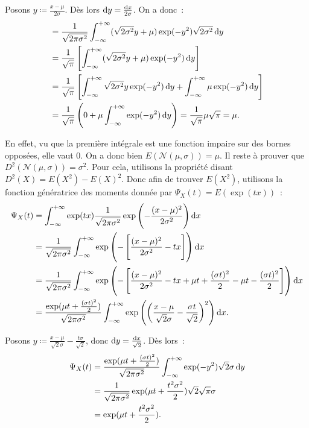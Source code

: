 \documentclass{article}
\newcommand{\Nms}{{\mathcal N(\mu, \sigma)}}
\begin{document}
			Posons $y \coloneqq\frac {x-\mu}{2\sigma}$. Dès lors $\dif y = \frac {\dif x}{2\sigma}$. On a donc~:
			\begin{align*}
				&= \frac 1{\sqrt {2\pi\sigma^2}}\int_{-\infty}^{+\infty}(\sqrt {2\sigma^2}y + \mu)\exp(-y^2)\sqrt {2\sigma^2}\dif y \\
				&= \frac 1{\sqrt \pi}\left[\int_{-\infty}^{+\infty}(\sqrt {2\sigma^2}y + \mu)\exp(-y^2)\dif y\right] \\
				&= \frac 1{\sqrt \pi}\left[\int_{-\infty}^{+\infty}\sqrt {2\sigma^2}y\exp(-y^2)\dif y + \int_{-\infty}^{+\infty}\mu\exp(-y^2)\dif y\right] \\
				&= \frac 1{\sqrt{\pi}}\left(0 + \mu\int_{-\infty}^{+\infty}\exp(-y^2)\dif y\right) = \frac 1{\sqrt \pi}\mu\sqrt {\pi} = \mu.
			\end{align*}

			En effet, vu que la première intégrale est une fonction impaire sur des bornes opposées, elle vaut 0. On a donc bien $E(\Nms) = \mu$. Il reste à prouver que
			$D^2(\Nms) = \sigma^2$. Pour cela, utilisons la propriété disant $D^2(X) = E(X^2) - E(X)^2$. Donc afin de trouver $E(X^2)$, utilisons la fonction génératrice
			des moments donnée par $\Psi_X(t) = E(\exp(tx))$~:
			\begin{align*}
				\Psi_X(t) &= \int_{-\infty}^{+\infty}\exp(tx)\frac 1{\sqrt {2\pi\sigma^2}}\exp\left(-\frac {(x-\mu)^2}{2\sigma^2}\right)\dif x \\
					&= \frac 1{\sqrt {2\pi\sigma^2}}\int_{-\infty}^{+\infty}\exp\left(-\left[\frac {(x-\mu)^2}{2\sigma^2} - tx\right]\right)\dif x \\
					&= \frac 1{\sqrt {2\pi\sigma^2}}\int_{-\infty}^{+\infty}\exp\left(-\left[\frac {(x-\mu)^2}{2\sigma^2} - tx
						+ \mu t + \frac {(\sigma t)^2}2 - \mu t - \frac {(\sigma t)^2}2\right]\right)\dif x \\
					&= \frac {\exp(\mu t + \frac {(\sigma t)^2}2)}{\sqrt {2\pi\sigma^2}}\int_{-\infty}^{+\infty}\exp\left(\left(\frac {x-\mu}{\sqrt 2\sigma}
						- \frac {\sigma t}{\sqrt 2}\right)^2\right)\dif x.
			\end{align*}

			Posons $y \coloneqq \frac {x-\mu}{\sqrt 2\sigma} - \frac {t\sigma}{\sqrt 2}$, donc $\dif y = \frac {\dif x}{\sqrt 2}$. Dès lors~:
			\begin{align*}
				\Psi_X(t) &= \frac {\exp(\mu t + \frac {(\sigma t)^2}2)}{\sqrt {2\pi\sigma^2}}\int_{-\infty}^{+\infty}\exp(-y^2)\sqrt 2 \sigma \dif y \\
				&= \frac 1{\sqrt {2\pi\sigma^2}}\exp(\mu t + \frac {t^2\sigma^2}2)\sqrt 2\sqrt \pi \sigma \\
				&= \exp(\mu t + \frac {t^2\sigma^2}2).
			\end{align*}
\end{document}
